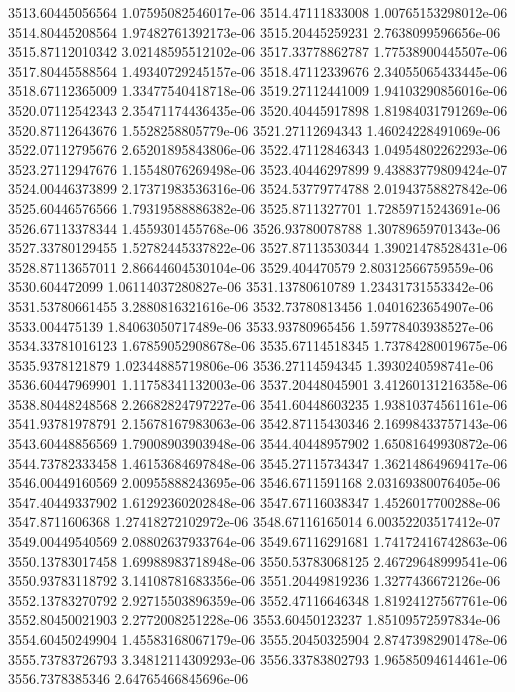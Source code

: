 {3513.60445056564 1.07595082546017e-06
3514.47111833008 1.00765153298012e-06
3514.80445208564 1.97482761392173e-06
3515.20445259231 2.7638099596656e-06
3515.87112010342 3.02148595512102e-06
3517.33778862787 1.77538900445507e-06
3517.80445588564 1.49340729245157e-06
3518.47112339676 2.34055065433445e-06
3518.67112365009 1.33477540418718e-06
3519.27112441009 1.94103290856016e-06
3520.07112542343 2.35471174436435e-06
3520.40445917898 1.81984031791269e-06
3520.87112643676 1.5528258805779e-06
3521.27112694343 1.46024228491069e-06
3522.07112795676 2.65201895843806e-06
3522.47112846343 1.04954802262293e-06
3523.27112947676 1.15548076269498e-06
3523.40446297899 9.43883779809424e-07
3524.00446373899 2.17371983536316e-06
3524.53779774788 2.01943758827842e-06
3525.60446576566 1.79319588886382e-06
3525.8711327701 1.72859715243691e-06
3526.67113378344 1.4559301455768e-06
3526.93780078788 1.30789659701343e-06
3527.33780129455 1.52782445337822e-06
3527.87113530344 1.39021478528431e-06
3528.87113657011 2.86644604530104e-06
3529.404470579 2.80312566759559e-06
3530.604472099 1.06114037280827e-06
3531.13780610789 1.23431731553342e-06
3531.53780661455 3.2880816321616e-06
3532.73780813456 1.0401623654907e-06
3533.004475139 1.84063050717489e-06
3533.93780965456 1.59778403938527e-06
3534.33781016123 1.67859052908678e-06
3535.67114518345 1.73784280019675e-06
3535.9378121879 1.02344885719806e-06
3536.27114594345 1.3930240598741e-06
3536.60447969901 1.11758341132003e-06
3537.20448045901 3.41260131216358e-06
3538.80448248568 2.26682824797227e-06
3541.60448603235 1.93810374561161e-06
3541.93781978791 2.15678167983063e-06
3542.87115430346 2.16998433757143e-06
3543.60448856569 1.79008903903948e-06
3544.40448957902 1.65081649930872e-06
3544.73782333458 1.46153684697848e-06
3545.27115734347 1.36214864969417e-06
3546.00449160569 2.00955888243695e-06
3546.6711591168 2.03169380076405e-06
3547.40449337902 1.61292360202848e-06
3547.67116038347 1.4526017700288e-06
3547.8711606368 1.27418272102972e-06
3548.67116165014 6.00352203517412e-07
3549.00449540569 2.08802637933764e-06
3549.67116291681 1.74172416742863e-06
3550.13783017458 1.69988983718948e-06
3550.53783068125 2.46729648999541e-06
3550.93783118792 3.14108781683356e-06
3551.20449819236 1.3277436672126e-06
3552.13783270792 2.92715503896359e-06
3552.47116646348 1.81924127567761e-06
3552.80450021903 2.2772008251228e-06
3553.60450123237 1.85109572597834e-06
3554.60450249904 1.45583168067179e-06
3555.20450325904 2.87473982901478e-06
3555.73783726793 3.34812114309293e-06
3556.33783802793 1.96585094614461e-06
3556.7378385346 2.64765466845696e-06
}
